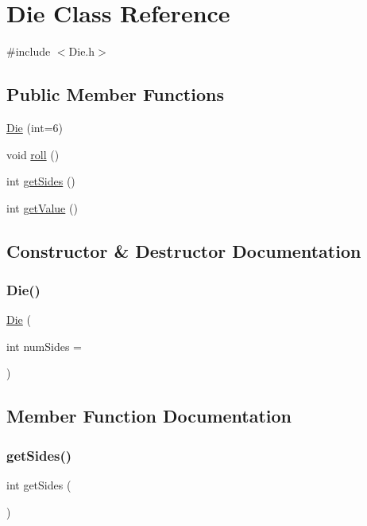 \hypertarget{class_die}{}\section{Die Class Reference}
\label{class_die}


{\ttfamily \#include $<$Die.\+h$>$}

\subsection*{Public Member Functions}
\begin{DoxyCompactItemize}
\item 
\mbox{\hyperlink{class_die_aa2476499650cafb32d9b673b4faaa1c5}{Die}} (int=6)
\item 
void \mbox{\hyperlink{class_die_a163b2d39ba34f54f049548b12fb68c73}{roll}} ()
\item 
int \mbox{\hyperlink{class_die_abbfef753241f5f25411ccc6dd8b1fbf1}{get\+Sides}} ()
\item 
int \mbox{\hyperlink{class_die_aae714dc01fe7f5bb1a175d0d1068bb92}{get\+Value}} ()
\end{DoxyCompactItemize}


\subsection{Constructor \& Destructor Documentation}
\mbox{\label{class_die_aa2476499650cafb32d9b673b4faaa1c5}} 
\subsubsection{\texorpdfstring{Die()}{Die()}}
{\footnotesize\ttfamily \mbox{\hyperlink{class_die}{Die}} (\begin{DoxyParamCaption}\item[{int}]{num\+Sides = {} }\end{DoxyParamCaption})}



\subsection{Member Function Documentation}
\mbox{\label{class_die_abbfef753241f5f25411ccc6dd8b1fbf1}} 
\subsubsection{\texorpdfstring{getSides()}{getSides()}}
{\footnotesize\ttfamily int get\+Sides (\begin{DoxyParamCaption}{ }\end{DoxyParamCaption})}

